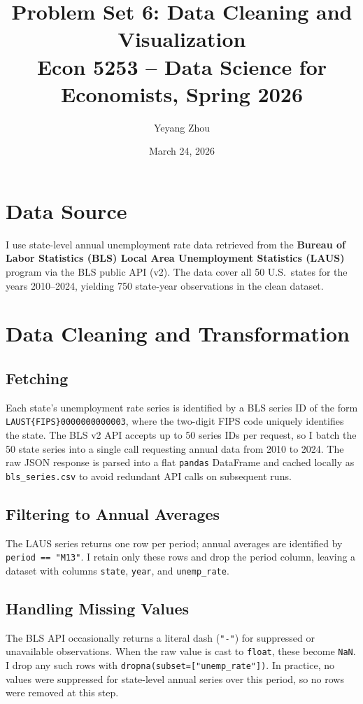 \documentclass[12pt]{article}
\title{\textbf{Problem Set 6: Data Cleaning and Visualization}\\
       \large Econ 5253 -- Data Science for Economists, Spring 2026}
\author{Yeyang Zhou}
\date{March 24, 2026}
\begin{document}
\maketitle

\section{Data Source}

I use state-level annual unemployment rate data retrieved from the
\textbf{Bureau of Labor Statistics (BLS) Local Area Unemployment Statistics (LAUS)}
program via the BLS public API (v2).  The data cover all 50 U.S.\ states
for the years 2010--2024, yielding 750 state-year observations in the
clean dataset.

\section{Data Cleaning and Transformation}

\subsection{Fetching}
Each state's unemployment rate series is identified by a BLS series ID of
the form \texttt{LAUST\{FIPS\}0000000000003}, where the two-digit FIPS code
uniquely identifies the state.  The BLS v2 API accepts up to 50 series IDs
per request, so I batch the 50 state series into a single call requesting
annual data from 2010 to 2024.  The raw JSON response is parsed into a
flat \texttt{pandas} DataFrame and cached locally as \texttt{bls\_series.csv}
to avoid redundant API calls on subsequent runs.

\subsection{Filtering to Annual Averages}
The LAUS series returns one row per period; annual averages are identified
by \texttt{period == "M13"}.  I retain only these rows and drop the period
column, leaving a dataset with columns \texttt{state}, \texttt{year}, and
\texttt{unemp\_rate}.

\subsection{Handling Missing Values}
The BLS API occasionally returns a literal dash (\texttt{"-"}) for suppressed
or unavailable observations.  When the raw value is cast to \texttt{float},
these become \texttt{NaN}.  I drop any such rows with
\texttt{dropna(subset=["unemp\_rate"])}.  In practice, no values were
suppressed for state-level annual series over this period, so no rows
were removed at this step.
\end{document}
